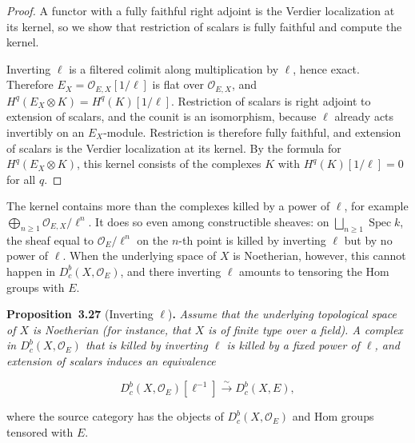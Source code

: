 \documentclass[11pt]{article}
\newenvironment{bpstatement}[2]{\par\addvspace{0.6\baselineskip}\noindent\textbf{#1}#2\textbf{.}\enspace\ignorespaces}
  {\par\addvspace{0.4\baselineskip}}
\newenvironment{bpstatementit}[2]{\begin{bpstatement}{#1}{#2}\itshape\ignorespaces}{\end{bpstatement}}
\providecommand{\Dbc}{}\renewcommand{\Dbc}{D^b_c}
\begin{document}
\begin{proof}[{Proof}]\label{bp89}%
A functor with a fully faithful right adjoint is the Verdier localization at its kernel, so we show that restriction of scalars is fully faithful and compute the kernel.

Inverting \(\ell\) is a filtered colimit along multiplication by \(\ell\), hence exact. Therefore \(E_X=\mathcal O_{E,X}[1/\ell]\) is flat over \(\mathcal O_{E,X}\), and \(H^q(E_X\otimes K)=H^q(K)[1/\ell]\). Restriction of scalars is right adjoint to extension of scalars, and the counit is an isomorphism, because \(\ell\) already acts invertibly on an \(E_X\)-module. Restriction is therefore fully faithful, and extension of scalars is the Verdier localization at its kernel. By the formula for \(H^q(E_X\otimes K)\), this kernel consists of the complexes \(K\) with \(H^q(K)[1/\ell]=0\) for all \(q\).
\end{proof}

\label{bp90}%
The kernel contains more than the complexes killed by a power of \(\ell\), for example \(\bigoplus_{n\ge1}\mathcal O_{E,X}/\ell^n\). It does so even among constructible sheaves: on \(\bigsqcup_{n\ge1}\operatorname{Spec}k\), the sheaf equal to \(\mathcal O_E/\ell^n\) on the \(n\)-th point is killed by inverting \(\ell\) but by no power of \(\ell\). When the underlying space of \(X\) is Noetherian, however, this cannot happen in \(\Dbc(X,\mathcal O_E)\), and there inverting \(\ell\) amounts to tensoring the Hom groups with \(E\).

\label{bp91}%
\begin{bpstatementit}{Proposition~3.27}{ (Inverting $\ell$)}
Assume that the underlying topological space of \(X\) is Noetherian (for instance, that \(X\) is of finite type over a field). A complex in \(\Dbc(X,\mathcal O_E)\) that is killed by inverting \(\ell\) is killed by a fixed power of \(\ell\), and extension of scalars induces an equivalence

\[
\Dbc(X,\mathcal O_E)[\ell^{-1}]\xrightarrow{\ \sim\ }\Dbc(X,E),
\]

where the source category has the objects of \(\Dbc(X,\mathcal O_E)\) and Hom groups tensored with \(E\).
\end{bpstatementit}
\end{document}
